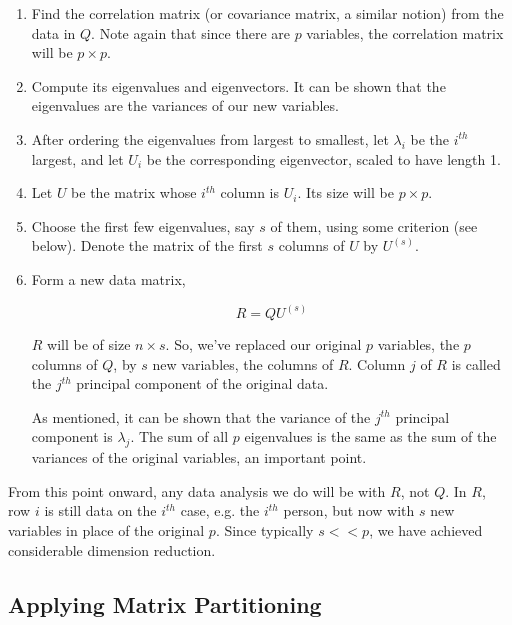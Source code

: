 \begin{enumerate}


\item Find the correlation matrix (or covariance matrix, a similar
notion) from the data in $Q$.  Note again that since there are $p$
variables, the correlation matrix will be $p \times p$.

\item Compute its eigenvalues and eigenvectors.  It can be shown that
the eigenvalues are the variances of our new variables.

\item After ordering the eigenvalues from largest to smallest, let
$\lambda_i$ be the $i^{th}$ largest, and let $U_i$ be the corresponding
eigenvector, scaled to have length 1.  

\item Let $U$ be the matrix whose $i^{th}$ column is $U_i$.  Its size
will be $p \times p$.

\item Choose the first few eigenvalues, say $s$ of them, using some
criterion (see below).  Denote the matrix of the first $s$ columns of $U$
by $U^{(s)}$.  

\item Form a new data matrix, 

\begin{equation}
\label{rqu}
R = Q U^{(s)}
\end{equation}

$R$ will be of size $n \times s$.  So, we've replaced our original $p$
variables, the $p$ columns of $Q$, by $s$ new variables, the columns of
$R$.  Column $j$ of $R$ is called the $j^{th}$ principal component of
the original data.  

As mentioned, it can be shown that the variance of the $j^{th}$ principal
component is $\lambda_j$.  The sum of all $p$ eigenvalues is the same as
the sum of the variances of the original variables, an important point.

\end{enumerate} 

From this point onward, any data analysis we do will be with $R$, not
$Q$.  In $R$, row $i$ is still data on the $i^{th}$ case, e.g. the
$i^{th}$ person, but now with $s$ new variables in place of the original
$p$.  Since typically $s << p$, we have achieved considerable dimension
reduction.

\subsection{Applying Matrix Partitioning}


